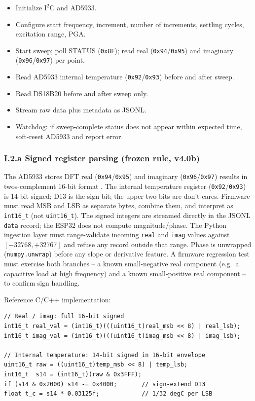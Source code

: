 \documentclass[11pt,a4paper]{article}
\begin{document}
\begin{itemize}
\item Initialize $\mathrm{I^2C}$ and AD5933.
\item Configure start frequency, increment, number of increments, settling cycles, excitation range, PGA.
\item Start sweep; poll STATUS (\texttt{0x8F}); read real (\texttt{0x94}/\texttt{0x95}) and imaginary (\texttt{0x96}/\texttt{0x97}) per point.
\item Read AD5933 internal temperature (\texttt{0x92}/\texttt{0x93}) before and after sweep.
\item Read DS18B20 before and after sweep only.
\item Stream raw data plus metadata as JSONL.
\item Watchdog: if sweep-complete status does not appear within expected time, soft-reset AD5933 and report error.
\end{itemize}

\subsubsection*{I.2.a Signed register parsing (frozen rule, v4.0b)}

\begin{rulebox}
The AD5933 stores DFT real (\texttt{0x94}/\texttt{0x95}) and imaginary (\texttt{0x96}/\texttt{0x97}) results in twos-complement 16-bit format \cite{ad5933ds}. The internal temperature register (\texttt{0x92}/\texttt{0x93}) is 14-bit signed; D13 is the sign bit; the upper two bits are don't-cares. Firmware must read MSB and LSB as separate bytes, combine them, and interpret as \texttt{int16\_t} (not \texttt{uint16\_t}). The signed integers are streamed directly in the JSONL \texttt{data} record; the ESP32 does not compute magnitude/phase. The Python ingestion layer must range-validate incoming \texttt{real} and \texttt{imag} values against $[-32768,+32767]$ and refuse any record outside that range. Phase is unwrapped (\texttt{numpy.unwrap}) before any slope or derivative feature. A firmware regression test must exercise both branches -- a known small-negative real component (e.g.\ a capacitive load at high frequency) and a known small-positive real component -- to confirm sign handling.
\end{rulebox}

Reference C/C++ implementation:
\begin{verbatim}
// Real / imag: full 16-bit signed
int16_t real_val = (int16_t)(((uint16_t)real_msb << 8) | real_lsb);
int16_t imag_val = (int16_t)(((uint16_t)imag_msb << 8) | imag_lsb);

// Internal temperature: 14-bit signed in 16-bit envelope
uint16_t raw = ((uint16_t)temp_msb << 8) | temp_lsb;
int16_t  s14 = (int16_t)(raw & 0x3FFF);
if (s14 & 0x2000) s14 -= 0x4000;       // sign-extend D13
float t_c = s14 * 0.03125f;            // 1/32 degC per LSB
\end{verbatim}
\end{document}
